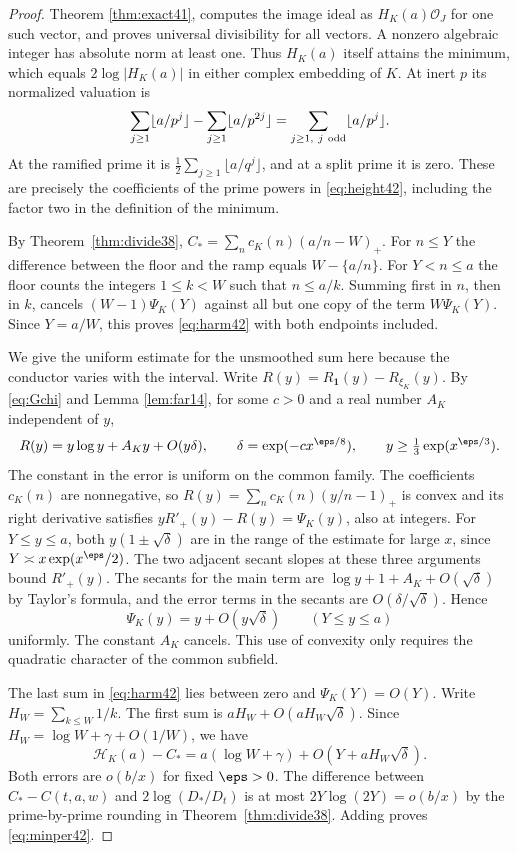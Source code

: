 \documentclass[a4paper,11pt]{article}
\theoremstyle{definition}
\theoremstyle{remark}
\numberwithin{equation}{section}
\begin{document}
\begin{proof}
Theorem \ref{thm:exact41}, computes the image ideal as \(H_K(a)\mathcal O_J\) for one such vector, and proves universal divisibility for all vectors. A nonzero algebraic integer has absolute norm at least one. Thus \(H_K(a)\) itself attains the minimum, which equals \(2\log|H_K(a)|\) in either complex embedding of \(K\). At inert \(p\) its normalized valuation is
\[
  \sum_{j\ge1}\lfloor a/p^j\rfloor-
  \sum_{j\ge1}\lfloor a/p^{2j}\rfloor
       =\sum_{j\ge1,\ j\ {\rm odd}}\lfloor a/p^j\rfloor .
\]
At the ramified prime it is \(\tfrac12\sum_{j\ge1}\lfloor a/q^j\rfloor\), and at a split prime it is zero. These are precisely the coefficients of the prime powers in \eqref{eq:height42}, including the factor two in the definition of the minimum.

By Theorem~\ref{thm:divide38}, \(C_*=\sum_n c_K(n)(a/n-W)_+\). For \(n\le Y\) the difference between the floor and the ramp equals \(W-\{a/n\}\). For \(Y<n\le a\) the floor counts the integers \(1\le k<W\) such that \(n\le a/k\). Summing first in \(n\), then in \(k\), cancels \((W-1)\Psi_K(Y)\) against all but one copy of the term \(W\Psi_K(Y)\). Since \(Y=a/W\), this proves \eqref{eq:harm42} with both endpoints included.

We give the uniform estimate for the unsmoothed sum here because the conductor varies with the interval. Write \(R(y)=R_{\mathbf1}(y)-R_{\xi_K}(y)\). By \eqref{eq:Gchi} and Lemma \ref{lem:far14}, for some \(c>0\) and a real number \(A_K\) independent of \(y\),
\[
 R(y)= y\log y + A_K y + O(y\delta),\qquad
     \delta=\exp(-c x^{\eps/8}),\qquad
     y\ge \tfrac13\exp(x^{\eps/3}).
\]
The constant in the error is uniform on the common family. The coefficients \(c_K(n)\) are nonnegative, so \(R(y)=\sum_n c_K(n)(y/n-1)_+\) is convex and its right derivative satisfies
\(yR'_+(y)-R(y)=\Psi_K(y)\), also at integers. For \(Y\le y\le a\), both \(y(1\pm\sqrt\delta)\) are in the range of the estimate for large \(x\), since \(Y\asymp x\exp(x^\eps/2)\). The two adjacent secant slopes at these three arguments bound \(R'_+(y)\). The secants for the main term are \(\log y+1+A_K+O(\sqrt\delta)\) by Taylor's formula, and the error terms in the secants are \(O(\delta/\sqrt\delta)\). Hence
\[
                   \Psi_K(y)=y+O(y\sqrt\delta)
                \qquad (Y\le y\le a)
\]
uniformly. The constant \(A_K\) cancels. This use of convexity only requires the quadratic character of the common subfield.

The last sum in \eqref{eq:harm42} lies between zero and \(\Psi_K(Y)=O(Y)\). Write \(H_W=\sum_{k\le W}1/k\). The first sum is \(aH_W+O(a H_W\sqrt\delta)\). Since \(H_W=\log W+\gamma+O(1/W)\), we have
\[
           \mathcal H_K(a)-C_* =a(\log W+\gamma)
                          +O(Y+aH_W\sqrt\delta).
\]
Both errors are \(o(b/x)\) for fixed \(\eps>0\). The difference between \(C_*-C(t,a,w)\) and \(2\log(D_*/D_t)\) is at most \(2Y\log(2Y)=o(b/x)\) by the prime-by-prime rounding in Theorem~\ref{thm:divide38}. Adding proves \eqref{eq:minper42}.
\end{proof}
\end{document}
